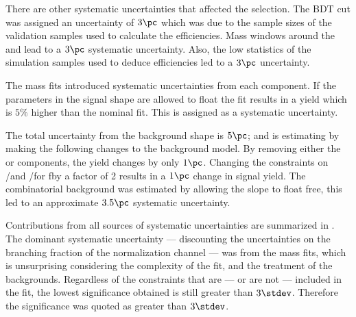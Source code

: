 There are other systematic uncertainties that affected the selection.
The BDT cut was assigned an uncertainty of $3\pc$ which was due to the sample sizes of the
validation samples used to calculate the efficiencies.
Mass windows around the \Ds and \phii lead to a $3\pc$ systematic uncertainty.
Also, the low statistics of the simulation samples used to deduce efficiencies led to a $3\pc$
uncertainty.

The mass fits introduced systematic uncertainties from each component.
If the parameters in the signal shape are allowed to float the fit results in a yield which is
$5\%$ higher than the nominal fit.
This is assigned as a systematic uncertainty.


The total uncertainty from the background shape is $5\pc$; and is estimating by making the
following changes to the background model.
By removing either the \btodsstrphi or \bstodsstrkstrk components, the yield changes by only $1\pc$.
Changing the constraints on \rA/\rB and \rC/\rD for \bstodskstrk fby a factor of 2 results in a
$1\pc$ change in signal yield.
The combinatorial background was estimated by allowing the slope to float free, this led to an
approximate $3.5\pc$ systematic uncertainty.


Contributions from all sources of systematic uncertainties are summarized in .
The dominant systematic uncertainty --- discounting the uncertainties on the branching fraction of
the normalization channel --- was from the mass fits, which is unsurprising considering the
complexity of the fit, and the treatment of the backgrounds.
Regardless of the constraints that are --- or are not --- included in the fit, the lowest
significance obtained is still greater than $3\stdev$.
Therefore the significance was quoted as greater than $3\stdev$.


